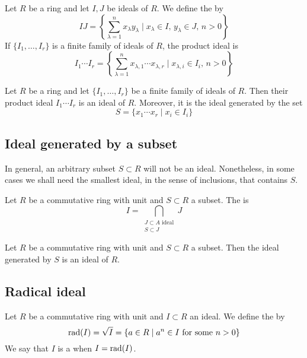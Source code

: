 \begin{definition}
	Let $R$ be a ring and let $I, J$ be ideals of $R$. We define the  by
	\[
		I J = 
		\left\{
			\sum_{\lambda = 1}^n x_\lambda y_\lambda \mid
			x_\lambda \in I, \, y_\lambda \in J, \, n > 0
		\right\}
	\]
	If $\{ I_1, \ldots, I_r \}$ is a finite family of ideals of $R$, the product ideal is 
	\[
		I_1 \cdots I_r = 
		\left\{
			\sum_{\lambda = 1}^n x_{\lambda,1} \cdots x_{\lambda,r} \mid
			x_{\lambda,i} \in I_i, \, n > 0
		\right\}
	\]
\end{definition}

\begin{prop}
	Let $R$ be a ring and let $\{ I_1, \ldots, I_r \}$ be a finite family of ideals of $R$. Then their product ideal $I_1 \cdots I_r$ is an ideal of $R$. Moreover, it is the ideal generated by the set
	\[
		S = \{ x_1 \cdots x_r \mid x_i \in I_i \}
	\]
\end{prop}

\subsection{Ideal generated by a subset}

In general, an arbitrary subset $S \subset R$ will not be an ideal. Nonetheless, in some cases we shall need the smallest ideal, in the sense of inclusions, that contains $S$. 

\begin{definition}
	Let $R$ be a commutative ring with unit and $S \subset R$ a subset. The  is
	\[
	I = \bigcap_{\substack{J \subset A \text{ ideal} \\ S \subset J}} J
	\]
\end{definition}

\begin{prop}
	Let $R$ be a commutative ring with unit and $S \subset R$ a subset. Then the ideal generated by $S$ is an ideal of $R$.
\end{prop}

\subsection{Radical ideal}

\begin{definition}
	Let $R$ be a commutative ring with unit and $I \subset R$ an ideal. We define the  by
	\[
		\mathrm{rad}(I) = \sqrt{I} = 
		\{
			a \in R \mid a^n \in I \text{ for some } n > 0
		\}
	\]
	We say that $I$ is a  when $I = \mathrm{rad}(I)$.
\end{definition}

